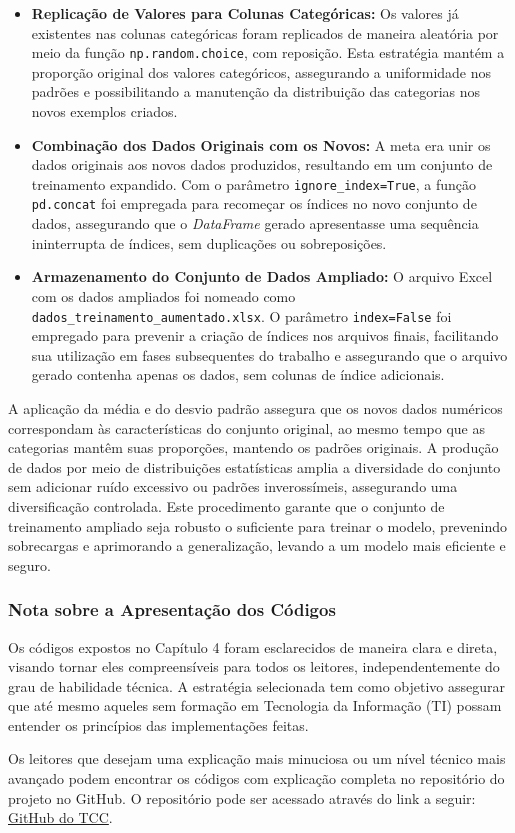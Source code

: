 \begin{itemize}
  \item \textbf{Replicação de Valores para Colunas Categóricas:} Os valores já existentes nas colunas categóricas foram replicados de maneira aleatória por meio da função \texttt{np.random.choice}, com reposição. Esta estratégia mantém a proporção original dos valores categóricos, assegurando a uniformidade nos padrões e possibilitando a manutenção da distribuição das categorias nos novos exemplos criados.

  \item \textbf{Combinação dos Dados Originais com os Novos:} A meta era unir os dados originais aos novos dados produzidos, resultando em um conjunto de treinamento expandido. Com o parâmetro \texttt{ignore\_index=True}, a função \texttt{pd.concat} foi empregada para recomeçar os índices no novo conjunto de dados, assegurando que o \textit{DataFrame} gerado apresentasse uma sequência ininterrupta de índices, sem duplicações ou sobreposições.

  \item \textbf{Armazenamento do Conjunto de Dados Ampliado:} O arquivo Excel com os dados ampliados foi nomeado como \texttt{dados\_treinamento\_aumentado.xlsx}. O parâmetro \texttt{index=False} foi empregado para prevenir a criação de índices nos arquivos finais, facilitando sua utilização em fases subsequentes do trabalho e assegurando que o arquivo gerado contenha apenas os dados, sem colunas de índice adicionais.
\end{itemize}

A aplicação da média e do desvio padrão assegura que os novos dados numéricos correspondam às características do conjunto original, ao mesmo tempo que as categorias mantêm suas proporções, mantendo os padrões originais. A produção de dados por meio de distribuições estatísticas amplia a diversidade do conjunto sem adicionar ruído excessivo ou padrões inverossímeis, assegurando uma diversificação controlada. Este procedimento garante que o conjunto de treinamento ampliado seja robusto o suficiente para treinar o modelo, prevenindo sobrecargas e aprimorando a generalização, levando a um modelo mais eficiente e seguro.

\subsubsection{Nota sobre a Apresentação dos Códigos}

Os códigos expostos no Capítulo 4 foram esclarecidos de maneira clara e direta, visando tornar eles compreensíveis para todos os leitores, independentemente do grau de habilidade técnica. A estratégia selecionada tem como objetivo assegurar que até mesmo aqueles sem formação em Tecnologia da Informação (TI) possam entender os princípios das implementações feitas.

Os leitores que desejam uma explicação mais minuciosa ou um nível técnico mais avançado podem encontrar os códigos com explicação completa no repositório do projeto no GitHub. O repositório pode ser acessado através do link a seguir: \href{https://github.com/sabrinaberno/TCC1}{GitHub do TCC}.